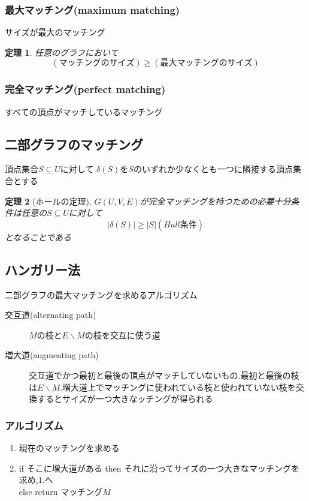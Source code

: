 \documentclass[a4j,10.5pt]{jarticle}
\theoremstyle{break}
\newtheorem{theo}{定理}[section]
\begin{document}
\subsubsection*{最大マッチング(maximum matching)}
サイズが最大のマッチング

\begin{theo}
任意のグラフにおいて
\[(マッチングのサイズ) \geq (最大マッチングのサイズ)\]
\end{theo}

\subsubsection*{完全マッチング(perfect matching)}
すべての頂点がマッチしているマッチング

\subsection{二部グラフのマッチング}
頂点集合$S \subseteq U$に対して
$\delta(S)$を$S$のいずれか少なくとも一つに隣接する頂点集合とする
\begin{theo}[ホールの定理]
$G(U,V,E)$が完全マッチングを持つための必要十分条件は任意の$S \subseteq U$に対して
\[|\delta(S)| \geq |S|(Hall条件) \]
となることである
\end{theo}

\subsection{ハンガリー法}
二部グラフの最大マッチングを求めるアルゴリズム

\begin{description}
\item[交互道(alternating path)] $M$の枝と$E \backslash M$の枝を交互に使う道
\item[増大道(augmenting path)] 交互道でかつ最初と最後の頂点がマッチしていないもの.最初と最後の枝は$E \backslash M$.増大道上でマッチングに使われている枝と使われていない枝を交換するとサイズが一つ大きなッチングが得られる
\end{description}

\subsubsection*{アルゴリズム}
\begin{enumerate}
\item 現在のマッチングを求める
\item if そこに増大道がある then それに沿ってサイズの一つ大きなマッチングを求め,1.へ\\
else return マッチング$M$
\end{enumerate}
\end{document}
